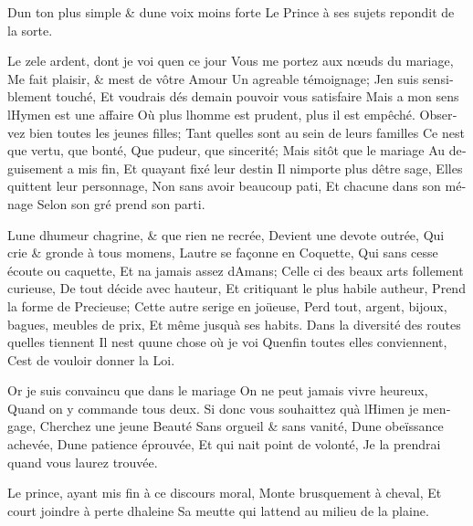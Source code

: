 \documentclass[14pt,a4paper]{memoir}
\begin{document}
{{\begin{otherlanguage}{french}
{D\textquotesingle un ton plus simple \& d\textquotesingle une voix
moins forte } {Le Prince à ses sujets repondit de la sorte.}

{Le zele ardent, dont je voi qu\textquotesingle en ce jour} {Vous me
portez aux nœuds du mariage,} {Me fait plaisir, \& m\textquotesingle est
de vôtre Amour} {Un agreable témoignage;} {J\textquotesingle en suis
sensiblement touché,} {Et voudrais dés demain pouvoir vous satisfaire}
{Mais a mon sens l\textquotesingle Hymen est une affaire} {Où plus
l\textquotesingle homme est prudent, plus il est empêché. } {Observez
bien toutes les jeunes filles;} {Tant qu\textquotesingle elles sont au
sein de leurs familles} {Ce n\textquotesingle est que vertu, que bonté,}
{Que pudeur, que sincerité;} {Mais sitôt que le mariage} {Au deguisement
a mis fin,} {Et qu\textquotesingle ayant fixé leur destin} {Il
n\textquotesingle importe plus d\textquotesingle être sage,} {Elles
quittent leur personnage,} {Non sans avoir beaucoup pati,} {Et chacune
dans son ménage} {Selon son gré prend son parti.}

{L\textquotesingle une d\textquotesingle humeur chagrine, \& que rien ne
recrée,} {Devient une devote outrée,} {Qui crie \& gronde à tous
momens,} {L\textquotesingle autre se façonne en Coquette,} {Qui sans
cesse écoute ou caquette,} {Et n\textquotesingle a jamais assez
d\textquotesingle Amans;} {Celle ci des beaux arts follement curieuse,}
{De tout décide avec hauteur,} {Et critiquant le plus habile autheur,}
{Prend la forme de Precieuse;} {Cette autre s\textquotesingle erige en
joüeuse,} {Perd tout, argent, bijoux, bagues, meubles de prix,} {Et même
jusqu\textquotesingle à ses habits.} {Dans la diversité des routes
qu\textquotesingle elles tiennent} {Il n\textquotesingle est
qu\textquotesingle une chose où je voi} {Qu\textquotesingle enfin toutes
elles conviennent,} {C\textquotesingle est de vouloir donner la Loi.}

{Or je suis convaincu que dans le mariage} {On ne peut jamais vivre
heureux,} {Quand on y commande tous deux.} {Si donc vous souhaittez
qu\textquotesingle à l\textquotesingle Himen je
m\textquotesingle engage, } {Cherchez une jeune Beauté} {Sans orgueil \&
sans vanité,} {D\textquotesingle une obeïssance achevée,}
{D\textquotesingle une patience éprouvée,} {Et qui n\textquotesingle ait
point de volonté,} {Je la prendrai quand vous l\textquotesingle aurez
trouvée.}

{Le prince, ayant mis fin à ce discours moral,} {Monte brusquement à
cheval,} {Et court joindre à perte d\textquotesingle haleine} {Sa meutte
qui l\textquotesingle attend au milieu de la plaine.}


\end{otherlanguage}}}
\end{document}
